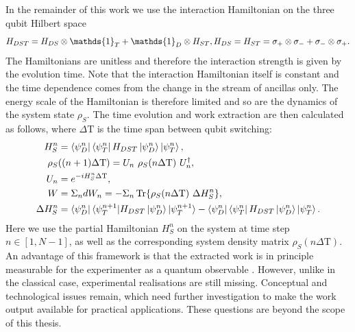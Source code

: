 In the remainder of this work we use the interaction Hamiltonian on the three qubit Hilbert space
\begin{equation*}
H_{DST} = H_{DS} \otimes \mathds{1}_T + \mathds{1}_D \otimes H_{ST}, \\
H_{DS} = H_{ST} = \sigma_{+} \otimes \sigma_{-} + \sigma_{-} \otimes \sigma_{+}.
\end{equation*}
The Hamiltonians are unitless and therefore the interaction strength is given by the evolution time.
Note that the interaction Hamiltonian itself is constant and the time dependence comes from the change in the stream of ancillas only.
The energy scale of the Hamiltonian is therefore limited and so are the dynamics of the system state $\rho_S$.
The time evolution and work extraction are then calculated as follows, where $\Delta \mathrm{T}$ is the time span between qubit switching:
\begin{align}
H_S^n &= \bra{\psi_D^n}\bra{\psi_T^n} H_{DST} \ket{\psi_D^n} \ket{\psi_T^n}, \label{relham}\\
\rho_S &((n+1) \Delta \mathrm{T}) = U_n \ \rho_S(n \Delta \mathrm{T}) \ U^{\dagger}_n, \nonumber \\
U_n &= e^{-iH_S^n \Delta \mathrm{T}}, \nonumber \\ 
W &= \Sigma_n dW_n = - \Sigma_n \Tr{\rho_S(n \Delta \mathrm{T}) \ \Delta H_S^n}, \label{dw} \\
\Delta H_S^n &= \bra{\psi_D^n} \langle \psi_T^{n+1} | H_{DST} \ket{\psi_D^n} | \psi_T^{n+1} \rangle  - \bra{\psi_D^n}\bra{\psi_T^n} H_{DST} \ket{\psi_D^n} \ket{\psi_T^n}. \label{deltaham}
\end{align}
Here we use the partial Hamiltonian $H_S^n$ on the system at time step $n \in [1, N - 1]$, as well as the corresponding system density matrix $\rho_S(n \Delta \mathrm{T})$.
An advantage of this framework is that the extracted work is in principle measurable for the experimenter as a quantum observable \cite{beyer2020}.
However, unlike in the classical case, experimental realisations are still missing.
Conceptual and technological issues remain, which need further investigation to make the work output available for practical applications.
These questions are beyond the scope of this thesis.

